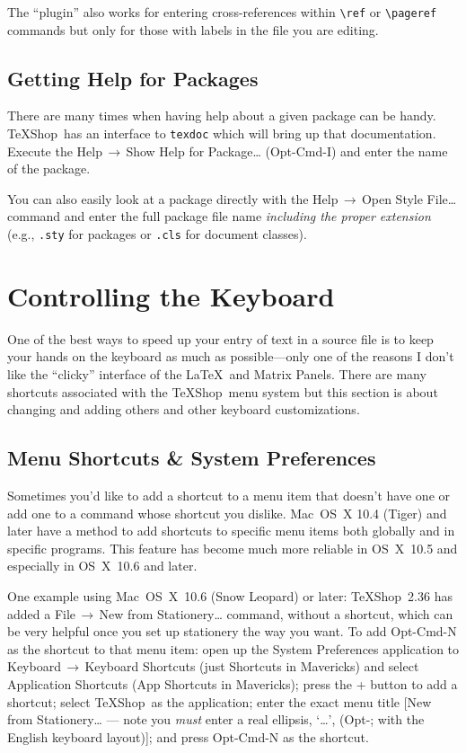 \documentclass[letterpaper,11pt]{article}
\newcommand{\TS}{\textsf{\TeX Shop}}
\newcommand{\cmd}[1]{\textsf{#1}}
\newcommand{\mnu}[1]{\textsf{#1}}
\newcommand{\To}{\,\(\to\)\,}
\begin{document}
The ``plugin'' also works for entering cross-references within \verb|\ref| or \verb|\pageref| commands but only for those with labels in the file you are editing.

\subsection{Getting Help for Packages}

There are many times when having help about a given package can be handy. \TS\ has an interface to \texttt{texdoc} which will bring up that documentation. Execute the \mnu{Help}\To\mnu{Show Help for Package…} (\cmd{Opt-Cmd-I}) and enter the name of the package.

You can also easily look at a package directly with the \mnu{Help}\To\mnu{Open Style File…} command and enter the full package file name \emph{including the proper extension} (e.g., \texttt{.sty} for packages or \texttt{.cls} for document classes).

\section{Controlling the Keyboard}

One of the best ways to speed up your entry of text in a source file is to keep your hands on the keyboard as much as possible---only one of the reasons I don't like the ``clicky'' interface of the \LaTeX\ and Matrix Panels. There are many shortcuts associated with the \TS\ menu system but this section is about changing and adding others and other keyboard customizations.

\subsection{Menu Shortcuts \& System Preferences}

Sometimes you'd like to add a shortcut to a menu item that doesn't have one or add one to a command whose shortcut you dislike. Mac~OS~X 10.4 (Tiger) and later have a method to add shortcuts to specific menu items both globally and in specific programs. This feature has become much more reliable in OS~X~10.5 and especially in OS~X~10.6 and later.

One example using Mac~OS~X~10.6 (Snow Leopard) or later: \TS\ 2.36 has added a \mnu{File}\To\mnu{New from Stationery…} command, without a shortcut, which can be very helpful once you set up stationery the way you want. To add \cmd{Opt-Cmd-N} as the shortcut to that menu item: open up the \textsf{System Preferences} application to \mnu{Keyboard}\To\mnu{Keyboard Shortcuts} (just \mnu{Shortcuts} in \cmd{Mavericks}) and select \mnu{Application Shortcuts} (\mnu{App Shortcuts} in \cmd{Mavericks}); press the \mnu{+} button to add a shortcut; select \TS\ as the application; enter the exact menu title [\mnu{New from Stationery…} --- note you \emph{must} enter a real ellipsis, `…', (\cmd{Opt-;} with the English keyboard layout)]; and press \cmd{Opt-Cmd-N} as the shortcut.
\end{document}
